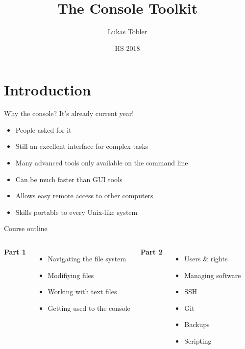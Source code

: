 

\title{The Console Toolkit}
\author{Lukas Tobler}
\date{HS 2018}


	\begin{frame}
		\titlepage%
	\end{frame}

    \section{Introduction}

    \begin{frame}[t,fragile]{Why the console? It's already current year!}
        \begin{itemize}
            \item People asked for it
            \item Still an excellent interface for complex tasks
            \item Many advanced tools only available on the command line
            \item Can be much faster than GUI tools
            \item Allows easy remote access to other computers
            \item Skills portable to every Unix-like system
        \end{itemize}
    \end{frame}

    \begin{frame}[t,fragile]{Course outline}
        \begin{columns}[T]
            \textbf{Part 1}
            \begin{itemize}
                \item Navigating the file system
                \item Modifiying files
                \item Working with text files
                \item Getting used to the console
            \end{itemize}
            \textbf{Part 2}
            \begin{itemize}
                \item{Users \& rights}
                \item{Managing software}
                \item{SSH}
                \item{Git}
                \item{Backups}
                \item{Scripting}
            \end{itemize}
        \end{columns}
    \end{frame}

